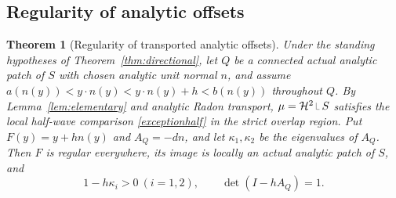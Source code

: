 \documentclass[11pt]{article}
\newtheorem{theorem}{Theorem}[section]
\newcommand{\HH}{\mathcal H}
\newcommand{\restr}{\mathbin{\vrule height 1.4ex depth 0pt width .06ex\vrule height .06ex depth 0pt width .65ex}}
\begin{document}
\subsection{Regularity of analytic offsets}\label{sec:nofocal}
\begin{theorem}[Regularity of transported analytic offsets]\label{thm:nofocal}
Under the standing hypotheses of Theorem~\ref{thm:directional}, let $Q$ be a connected actual analytic patch of $S$ with chosen analytic unit normal $n$, and assume $a(n(y))<y\cdot n(y)<y\cdot n(y)+h<b(n(y))$ throughout $Q$. By Lemma~\ref{lem:elementary} and analytic Radon transport, $\mu=\HH^2\restr S$ satisfies the local half-wave comparison \eqref{exceptionhalf} in the strict overlap region. Put $F(y)=y+hn(y)$ and $A_Q=-dn$, and let $\kappa_1,\kappa_2$ be the eigenvalues of $A_Q$. Then $F$ is regular everywhere, its image is locally an actual analytic patch of $S$, and
\[
 1-h\kappa_i>0\ (i=1,2),\qquad
 \det(I-hA_Q)=1.
\]
\end{theorem}
\end{document}
